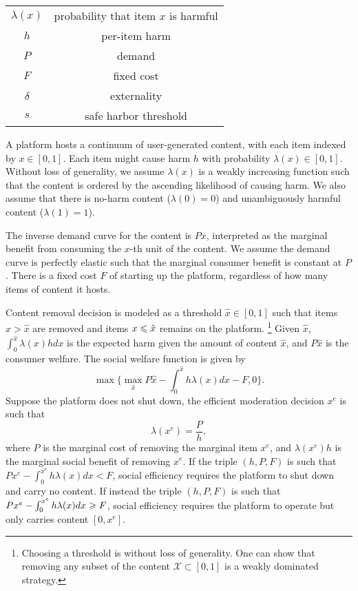 

\begin{tabular}{c|c}
    $\lambda(x)$ & probability that item $x$ is harmful \\
    $h$ & per-item harm \\
    $P$ & demand  \\
    $F$ & fixed cost \\
    $\delta$ & externality \\
    $s$ & safe harbor threshold
\end{tabular}

A platform hosts a continuum of user-generated content, with each item indexed by $x\in[0,1]$. 
Each item might cause harm $h$ with probability $\lambda(x)\in[0,1]$. Without loss of generality, we assume $\lambda(x)$ is a weakly increasing function such that the content is ordered by the ascending likelihood of causing harm. We also assume that there is no-harm content ($\lambda(0)=0$) and unambiguously harmful content ($\lambda(1)=1$).


The inverse demand curve for the content is $Px$, interpreted as the marginal benefit from consuming the $x$-th unit of the content. We assume the demand curve is perfectly elastic such that the marginal consumer benefit is constant at $P$.
There is a fixed cost $F$ of starting up the platform, regardless of how many items of content it hosts.

Content removal decision is modeled as a threshold $\hat{x}\in[0,1]$ such that items $x>\hat{x}$ are removed and items $x\leqslant\hat{x}$ remains on the platform. 
\footnote{Choosing a threshold is without loss of generality. One can show that removing any subset of the content $\mathcal{X}\subset[0,1]$ is a weakly dominated strategy.}
Given $\hat{x}$, $\int_0^{\hat{x}}\lambda(x)hdx$ is the expected harm given the amount of content $\hat{x}$, and $P\hat{x}$ is the consumer welfare.
The social welfare function is given by 
\begin{equation}\label{eqn:efficiency_1}
    \max\{\max_{\hat{x}}P\hat{x} - \int_0^{\hat{x}}h\lambda(x)dx-F, 0\}.
\end{equation}
Suppose the platform does not shut down, 
the efficient moderation decision $x^e$ is such that
\begin{equation}
    \lambda(x^e)=\frac{P}{h},
\end{equation}
where $P$ is the marginal cost of removing the marginal item $x^e$, and $\lambda(x^e)h$ is the marginal social benefit of removing $x^e$. 
If the triple $(h,P,F)$ is such that $Px^e - \int_0^{x^e}h\lambda(x)dx < F$, social efficiency requires the platform to shut down and carry no content. If instead the triple $(h,P,F)$ is such that $Px^e - \int_0^{x^e}h\lambda(x)dx \geqslant F$, social efficiency requires the platform to operate but only carries content $[0,x^e]$.

